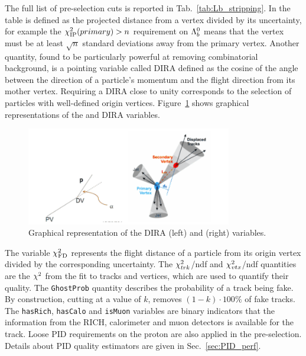 The full list of pre-selection cuts is reported in Tab.~\ref{tab:Lb_stripping}.
In the table \chisqip is defined as the projected distance from a vertex
divided by its uncertainty, for example the $\chi^2_{\rm IP}(primary) > n$ requirement on ${{\Lambda}^0_{b}}$ means
that the \Lb vertex must be at least $\sqrt{n}$ standard deviations away from the primary vertex.
Another quantity, found to be particularly powerful at removing combinatorial background, is a pointing variable called DIRA
defined as the cosine of the angle between the direction of a particle's momentum and
the flight direction from its mother vertex. Requiring a DIRA close to unity corresponds to 
the selection of particles with well-defined origin vertices.
Figure~\ref{fig:IPandDIRA} shows graphical representations of the \chisqip and DIRA variables.
%
\begin{figure}[hb]
\centering
\includegraphics[width=0.8\textwidth]{Lmumu/figs/IPandDIRA.png}
\caption{Graphical representation of the DIRA (left) and \chisqip (right) variables.}
\label{fig:IPandDIRA}
\end{figure}
%
The variable $\chi^2_{\rm FD}$ represents the flight distance of a particle from its origin vertex
divided by the corresponding uncertainty. The $\chi^2_{trk}$/ndf and $\chi^2_{vtx}$/ndf quantities are the $\chi^2$ 
from the fit to tracks and vertices, which are used to quantify their quality.
The \verb!GhostProb! quantity describes the probability of a track being fake.
By construction, cutting at a value of $k$, removes $(1 - k)\cdot 100 \%$ of fake tracks.
The \verb!hasRich!, \verb!hasCalo! and \verb!isMuon! variables are binary indicators that
the information from the RICH, calorimeter and muon detectors is available for the track.
Loose PID requirements on the proton are also applied in the pre-selection.
Details about PID quality estimators are given in Sec.~\ref{sec:PID_perf}.
